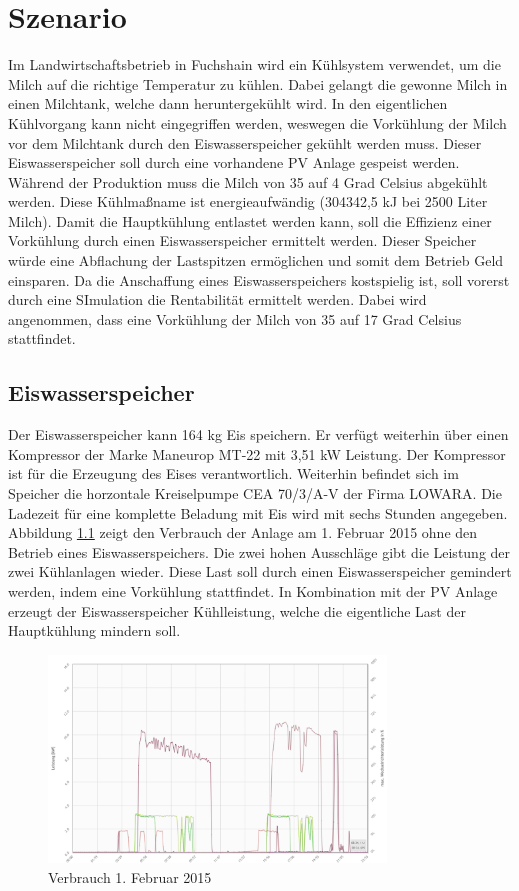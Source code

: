 \chapter{Szenario}
Im Landwirtschaftsbetrieb in Fuchshain wird ein Kühlsystem verwendet, um die Milch auf die richtige Temperatur zu kühlen. Dabei gelangt die gewonne Milch in einen Milchtank, welche dann heruntergekühlt wird. In den eigentlichen Kühlvorgang kann nicht eingegriffen werden, weswegen die Vorkühlung der Milch vor dem Milchtank durch den Eiswasserspeicher gekühlt werden muss. Dieser Eiswasserspeicher soll durch eine vorhandene PV Anlage gespeist werden.\\
Während der Produktion muss die Milch von 35 auf 4 Grad Celsius abgekühlt werden. Diese Kühlmaßname ist energieaufwändig (304342,5 kJ bei 2500 Liter Milch). Damit die Hauptkühlung entlastet werden kann, soll die Effizienz einer Vorkühlung durch einen Eiswasserspeicher ermittelt werden. Dieser Speicher würde eine Abflachung der Lastspitzen ermöglichen und somit dem Betrieb Geld einsparen. Da die Anschaffung eines Eiswasserspeichers kostspielig ist, soll vorerst durch eine SImulation die Rentabilität ermittelt werden. Dabei wird angenommen, dass eine Vorkühlung der Milch von 35 auf 17 Grad Celsius stattfindet.

\section{Eiswasserspeicher}
Der Eiswasserspeicher kann 164 kg Eis speichern. Er verfügt weiterhin über einen Kompressor der Marke Maneurop MT-22 mit 3,51 kW Leistung. Der Kompressor ist für die Erzeugung des Eises verantwortlich. Weiterhin befindet sich im Speicher die horzontale Kreiselpumpe CEA 70/3/A-V der Firma LOWARA. Die Ladezeit für eine komplette Beladung mit Eis wird mit sechs Stunden angegeben.\\
Abbildung \ref{verbrauch1feb} zeigt den Verbrauch der Anlage am 1. Februar 2015 ohne den Betrieb eines Eiswasserspeichers. Die zwei hohen Ausschläge gibt die Leistung der zwei Kühlanlagen wieder. Diese Last soll durch einen Eiswasserspeicher gemindert werden, indem eine Vorkühlung stattfindet. In Kombination mit der PV Anlage erzeugt der Eiswasserspeicher Kühlleistung, welche die eigentliche Last der Hauptkühlung mindern soll.
 \begin{figure}[H]
 	\centering
 	\includegraphics[width=0.8\textwidth]{bilder/verbrauch1feb.png}
 	\caption{Verbrauch 1. Februar 2015}
 	\label{verbrauch1feb}
 \end{figure}

